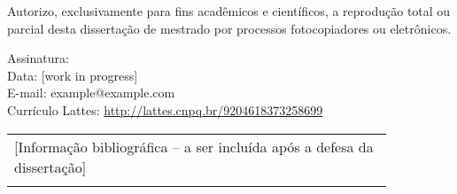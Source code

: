\begin{titlepage}
    Autorizo, exclusivamente para fins acadêmicos e científicos, a reprodução total ou parcial desta dissertação de mestrado por processos fotocopiadores ou eletrônicos.
    
    \vspace{2cm}
    Assinatura: \makebox[0.75\textwidth]{\hrulefill}\\
    Data: [work in progress]\\
    E-mail: example@example.com\\
    Currículo Lattes: \href{http://lattes.cnpq.br/9204618373258699}{http://lattes.cnpq.br/9204618373258699}\\
    \vfill
    \begin{center}
        \begin{tabular}{|p{0.85\linewidth}|}
            \hline
            [Informação bibliográfica -- a ser incluída após a defesa da dissertação]\\
            \\ \hline
        \end{tabular}

\end{center}
\end{titlepage}
